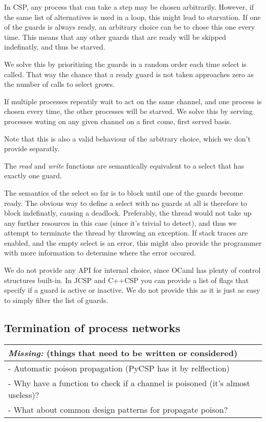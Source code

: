 \documentclass[a4paper,12pt]{article}
\newcommand{\missing}[1]{
  \begin{tabular}{|p{11cm}|}
    \hline
    \emph{Missing:} {\scriptsize (things that need to be written or considered)} \\
    \hline
    #1
    \hline
  \end{tabular}
}
\begin{document}
In CSP, any process that can take a step may be chosen arbitrarily. However, if the same list of 
alternatives is used in a loop, this might lead to starvation. If one of the guards is always ready,
an arbitrary choice can be to chose this one every time. This means that any other guards that are 
ready will be skipped indefinatly, and thus be starved.

We solve this by prioritizing the guards in a random order each time select is called. That way the
chance that a ready guard is not taken approaches zero as the number of calls to select grows.

If multiple processes repeatily wait to act on the same channel, and one process is chosen every time,
the other processes will be starved. We solve this by serving processes wating on any given channel
on a first come, first served basis.

Note that this is also a valid behaviour of the arbitrary choice, which we don't provide separatly.

The \emph{read} and \emph{write} functions are semantically equivalent to a select that has exactly 
one guard.

The semantics of the select so far is to block until one of the guards become ready. The obvious
way to define a select with no guards at all is therefore to block indefinatly, causing a deadlock.
Preferably, the thread would not take up any further resources in this case (since it's trivial to 
detect), and thus we attempt to terminate the thread by throwing an exception. If stack traces are
enabled, and the empty select is an error, this might also provide the programmer with more information
to determine where the error occured.

We do not provide any API for internal choice, since OCaml has plenty of control structures built-in.
In JCSP and C++CSP you can provide a list of flags that specify if a guard is active or inactive. We
do not provide this as it is just as easy to simply filter the list of guards.

\subsection{Termination of process networks}
\missing{
- Automatic poison propagation (PyCSP has it by relflection)\\
- Why have a function to check if a channel is poisoned (it's almost useless)?\\
- What about common design patterns for propagate poison?\\
}
\end{document}
